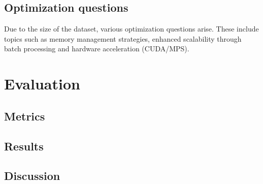 \documentclass[11pt,a4paper]{article}
\begin{document}
  \subsection{Optimization questions}
  Due to the size of the dataset, various optimization questions arise.
  These include topics such as memory management strategies, enhanced scalability through batch processing and hardware acceleration (CUDA/MPS).

  \section{Evaluation}
  \subsection{Metrics}

  \subsection{Results}

  \subsection{Discussion}
\end{document}
